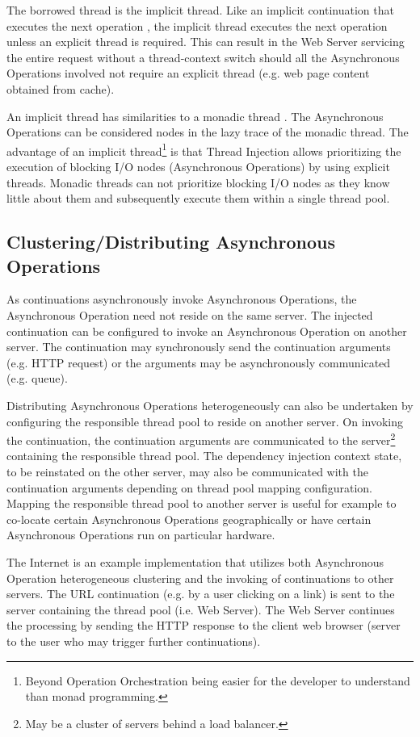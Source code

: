 \documentclass[prodmode]{style/acmlarge}
\begin{document}
The borrowed thread is the implicit thread.  Like an implicit continuation that
executes the next operation \cite{continuations}, the implicit thread executes
the next operation unless an explicit thread is required.  This can result in
the Web Server servicing the entire request without a thread-context switch
should all the Asynchronous Operations involved not require an explicit thread
(e.g. web page content obtained from cache).

An implicit thread has similarities to a monadic thread \cite{monadic-thread}.
The Asynchronous Operations can be considered nodes in the lazy trace of the
monadic thread.  The advantage of an implicit thread\footnote{Beyond Operation
Orchestration being easier for the developer to understand than monad
programming.} is that Thread Injection allows prioritizing the execution of
blocking I/O nodes (Asynchronous Operations) by using explicit threads.  Monadic
threads can not prioritize blocking I/O nodes as they know little about them and
subsequently execute them within a single thread pool.


\subsection{Clustering/Distributing Asynchronous Operations}

As continuations asynchronously invoke Asynchronous Operations, the Asynchronous
Operation need not reside on the same server.  The injected continuation can be
configured to invoke an Asynchronous Operation on another server.  The
continuation may synchronously send the continuation arguments (e.g. HTTP
request) or the arguments may be asynchronously communicated (e.g.
queue).

Distributing Asynchronous Operations heterogeneously can also be undertaken by
configuring the responsible thread pool to reside on another server.  On
invoking the continuation, the continuation arguments are communicated to the
server\footnote{May be a cluster of servers behind a load balancer.} containing
the responsible thread pool.  The dependency injection context state, to be
reinstated on the other server, may also be communicated with the continuation
arguments depending on thread pool mapping configuration.  Mapping the
responsible thread pool to another server is useful for example to co-locate
certain Asynchronous Operations geographically or have certain Asynchronous
Operations run on particular hardware.

The Internet is an example implementation that utilizes both Asynchronous
Operation heterogeneous clustering and the invoking of continuations to other
servers.  The URL continuation (e.g. by a user clicking on a link) is sent to
the server containing the thread pool (i.e. Web Server).  The Web Server
continues the processing by sending the HTTP response to the client web browser
(server to the user who may trigger further continuations).
\end{document}
